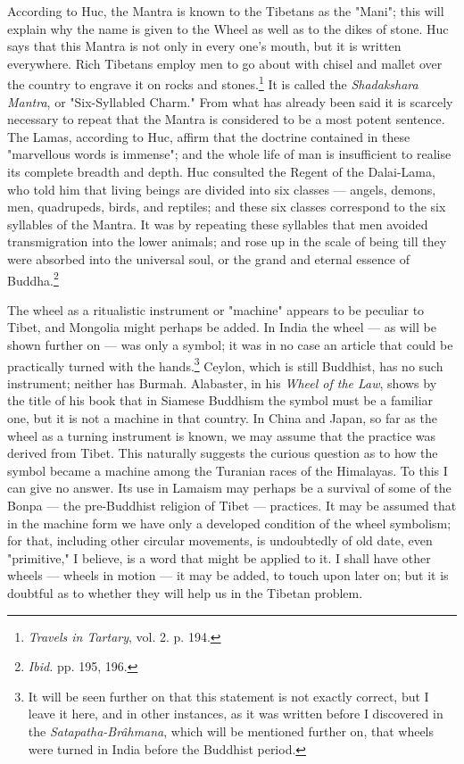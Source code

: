 \documentclass[a4paper, 11pt, oneside, polutonikogreek, english]{article}
\begin{document}
According to Huc, the Mantra is known to the Tibetans as the "Mani"; this will explain why the name is given to the Wheel as well as to the dikes of stone. Huc says that this Mantra is not only in every one's mouth, but it is written everywhere. Rich Tibetans employ men to go about with chisel and mallet over the country to engrave it on rocks and stones.\footnote{\emph{Travels in Tartary}, vol. 2. p. 194.} It is called the \emph{Shadakshara Mantra}, or "Six-Syllabled Charm." From what has already been said it is scarcely necessary to repeat that the Mantra is considered to be a most potent sentence. The Lamas, according to Huc, affirm that the doctrine contained in these "marvellous words is immense"; and the whole life of man is insufficient to realise its complete breadth and depth. Huc consulted the Regent of the Dalai-Lama, who told him that living beings are divided into six classes --- angels, demons, men, quadrupeds, birds, and reptiles; and these six classes correspond to the six syllables of the Mantra. It was by repeating these syllables that men avoided transmigration into the lower animals; and rose up in the scale of being till they were absorbed into the universal soul, or the grand and eternal essence of Buddha.\footnote{\emph{Ibid.} pp. 195, 196.}

The wheel as a ritualistic instrument or "machine" appears to be peculiar to Tibet, and Mongolia might perhaps be added. In India the wheel --- as will be shown further on --- was only a symbol; it was in no case an article that could be practically turned with the hands.\footnote{It will be seen further on that this statement is not exactly correct, but I leave it here, and in other instances, as it was written before I discovered in the \emph{Satapatha-Brâhmana}, which will be mentioned further on, that wheels were turned in India before the Buddhist period.} Ceylon, which is still Buddhist, has no such instrument; neither has Burmah. Alabaster, in his \emph{Wheel of the Law}, shows by the title of his book that in Siamese Buddhism the symbol must be a familiar one, but it is not a machine in that country. In China and Japan, so far as the wheel as a turning instrument is known, we may assume that the practice was derived from Tibet. This naturally suggests the curious question as to how the symbol became a machine among the Turanian races of the Himalayas. To this I can give no answer. Its use in Lamaism may perhaps be a survival of some of the Bonpa --- the pre-Buddhist religion of Tibet --- practices. It may be assumed that in the machine form we have only a developed condition of the wheel symbolism; for that, including other circular movements, is undoubtedly of old date, even "primitive," I believe, is a word that might be applied to it. I shall have other wheels --- wheels in motion --- it may be added, to touch upon later on; but it is doubtful as to whether they will help us in the Tibetan problem.
\end{document}
